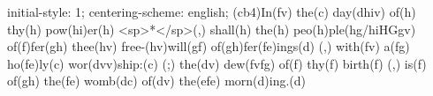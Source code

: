 initial-style: 1;
centering-scheme: english;
(cb4)In(fv) the(c) day(dhiv) of(h) thy(h) pow(hi)er(h) <sp>*</sp>(,) shall(h) the(h) peo(h)ple(hg/hiHGgv) of(f)fer(gh) thee(hv) free-(hv)will(gf) of(gh)fer(fe)ings(d) (,) with(fv) a(fg) ho(fe)ly(c) wor(dvv)ship:(c) (;) the(dv) dew(fvfg) of(f) thy(f) birth(f) (,) is(f) of(gh) the(fe) womb(dc) of(dv) the(efe) morn(d)ing.(d)